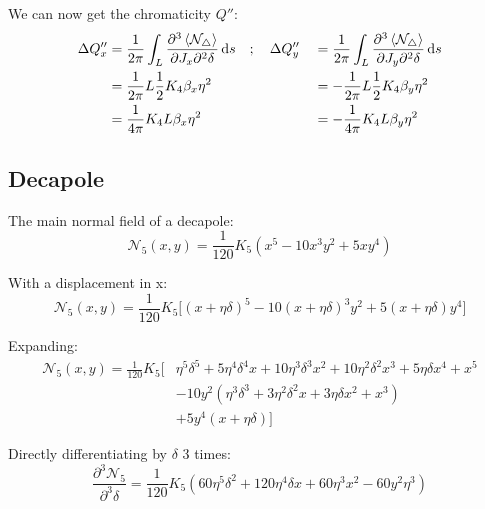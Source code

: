 We can now get the chromaticity \(Q''\): \begin{equation}\begin{aligned}
\Delta Q''_x &= \frac{1}{2\pi} \int_L \frac{\partial^3 \left< \mathcal{N_4} \right>}{\partial J_x \partial^2 \delta} \mathop{}\!\mathrm{d} s \quad; \quad \Delta Q''_y &&= \frac{1}{2\pi} \int_L \frac{\partial^3 \left< \mathcal{N_4} \right>}{\partial J_y \partial^2 \delta} \mathop{}\!\mathrm{d} s \\
&= \frac{1}{2 \pi} L \frac{1}{2} K_4 \beta_x \eta^2  &&= - \frac{1}{2 \pi} L \frac{1}{2} K_4 \beta_y \eta^2 \\
&= \frac{1}{4 \pi}  K_4 L \beta_x \eta^2 &&= - \frac{1}{4 \pi}  K_4 L \beta_y \eta^2
\end{aligned}\end{equation}

\hypertarget{decapole-1}{%
\subsection{Decapole}\label{decapole-1}}

The main normal field of a decapole:
\begin{equation}\mathcal{N_5}(x, y) = \frac{1}{120} K_{5} \left(x^5 - 10 x^3y^2 + 5xy^4 \right)\end{equation}

With a displacement in x:
\begin{equation}\mathcal{N_5}(x, y) = \frac{1}{120} K_{5} \biggl[(x+\eta\delta)^5 - 10 (x+\eta\delta)^3y^2 + 5(x+\eta\delta)y^4 \biggr]\end{equation}

Expanding: \begin{equation}\begin{aligned}
\mathcal{N_5}(x, y) = \frac{1}{120} K_{5} \biggl[&
  \eta^5\delta^5 + 5\eta^4\delta^4x + 10\eta^3\delta^3x^2 + 10\eta^2\delta^2 x^3 + 5\eta\delta x^4 + x^5 \\
  & -10y^2 (\eta^3\delta^3 + 3\eta^2\delta^2x + 3\eta\delta x^2 + x^3)\\
  & +5y^4 (x + \eta\delta) \biggr]
\end{aligned}\label{eq:decapole_expanded}\end{equation}

Directly differentiating by \(\delta\) 3 times:
\begin{equation}\frac{\partial^3 \mathcal{N_5}}{\partial^3 \delta} = \frac{1}{120} K_5 \left( 60\eta^5\delta^2 + 120 \eta^4\delta x + 60\eta^3x^2 - 60y^2\eta^3\right)\end{equation}

